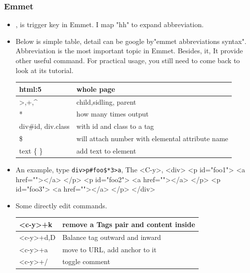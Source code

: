 \documentclass[a4paper,12pt,twoside]{book}
\begin{document}
\subsubsection{Emmet}
\begin{itemize}
		\item <C-y>, is trigger key in Emmet. I map "hh" to expand abbreviation.

		\item Below is simple table, detail can be google by"emmet abbreviations syntax". Abbreviation is the most important topic in Emmet. Besides, it, It provide other useful command.  For practical usage, you still need to come back to look at its tutorial. \\

\begin{tabular}{p{}|p{}}
\hline 
html:5  & whole page \\ 
\hline 
>,+,\^{} & child,sidling, parent  \\ 
\hline 
* &how many times output \\
\hline
div\#id, div.class & with id and class to a tag \\

\hline 
\$ & will attach number with elemental attribute name   \\

\hline
text \{ \} & add text to element \\
\hline
\end{tabular}

\item An example, type \verb=div>p#foo$*3>a=, The <C-y>, 
 <div>
       <p id="foo1">
		   <a href=""></a>
	   </p>
	   <p id="foo2">
		   <a href=""></a>
	   </p>
	   <p id="foo3">
		   <a href=""></a>
	   </p>
</div>

\item Some directly edit commands. \\

\begin{tabular}{p{}|p{}}
\hline 
<c-y>+k  & remove a Tags pair and content inside \\

\hline 
<c-y>+d,D & Balance tag outward and inward  \\

\hline 
<c-y>+a & move to URL, add anchor to it \\

\hline
<c-y>+/ & toggle comment \\


\end{tabular}
\end{itemize}
\end{document}

